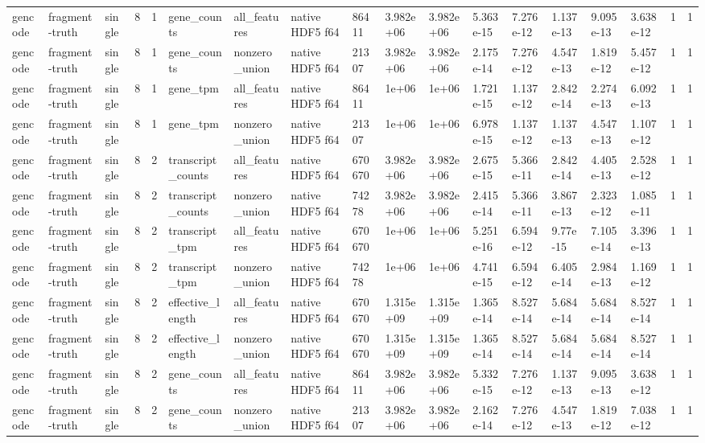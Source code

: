 \begin{tabular}{llllllllllllllllll}
gencode & fragment-truth & single & 8 & 1 & gene\_counts & all\_features & native HDF5 f64 & 86411 & 3.982e+06 & 3.982e+06 & 5.363e-15 & 7.276e-12 & 1.137e-13 & 9.095e-13 & 3.638e-12 & 1 & 1 \\
gencode & fragment-truth & single & 8 & 1 & gene\_counts & nonzero\_union & native HDF5 f64 & 21307 & 3.982e+06 & 3.982e+06 & 2.175e-14 & 7.276e-12 & 4.547e-13 & 1.819e-12 & 5.457e-12 & 1 & 1 \\
gencode & fragment-truth & single & 8 & 1 & gene\_tpm & all\_features & native HDF5 f64 & 86411 & 1e+06 & 1e+06 & 1.721e-15 & 1.137e-12 & 2.842e-14 & 2.274e-13 & 6.092e-13 & 1 & 1 \\
gencode & fragment-truth & single & 8 & 1 & gene\_tpm & nonzero\_union & native HDF5 f64 & 21307 & 1e+06 & 1e+06 & 6.978e-15 & 1.137e-12 & 1.137e-13 & 4.547e-13 & 1.107e-12 & 1 & 1 \\
gencode & fragment-truth & single & 8 & 2 & transcript\_counts & all\_features & native HDF5 f64 & 670670 & 3.982e+06 & 3.982e+06 & 2.675e-15 & 5.366e-11 & 2.842e-14 & 4.405e-13 & 2.528e-12 & 1 & 1 \\
gencode & fragment-truth & single & 8 & 2 & transcript\_counts & nonzero\_union & native HDF5 f64 & 74278 & 3.982e+06 & 3.982e+06 & 2.415e-14 & 5.366e-11 & 3.867e-13 & 2.323e-12 & 1.085e-11 & 1 & 1 \\
gencode & fragment-truth & single & 8 & 2 & transcript\_tpm & all\_features & native HDF5 f64 & 670670 & 1e+06 & 1e+06 & 5.251e-16 & 6.594e-12 & 9.77e-15 & 7.105e-14 & 3.396e-13 & 1 & 1 \\
gencode & fragment-truth & single & 8 & 2 & transcript\_tpm & nonzero\_union & native HDF5 f64 & 74278 & 1e+06 & 1e+06 & 4.741e-15 & 6.594e-12 & 6.405e-14 & 2.984e-13 & 1.169e-12 & 1 & 1 \\
gencode & fragment-truth & single & 8 & 2 & effective\_length & all\_features & native HDF5 f64 & 670670 & 1.315e+09 & 1.315e+09 & 1.365e-14 & 8.527e-14 & 5.684e-14 & 5.684e-14 & 8.527e-14 & 1 & 1 \\
gencode & fragment-truth & single & 8 & 2 & effective\_length & nonzero\_union & native HDF5 f64 & 670670 & 1.315e+09 & 1.315e+09 & 1.365e-14 & 8.527e-14 & 5.684e-14 & 5.684e-14 & 8.527e-14 & 1 & 1 \\
gencode & fragment-truth & single & 8 & 2 & gene\_counts & all\_features & native HDF5 f64 & 86411 & 3.982e+06 & 3.982e+06 & 5.332e-15 & 7.276e-12 & 1.137e-13 & 9.095e-13 & 3.638e-12 & 1 & 1 \\
gencode & fragment-truth & single & 8 & 2 & gene\_counts & nonzero\_union & native HDF5 f64 & 21307 & 3.982e+06 & 3.982e+06 & 2.162e-14 & 7.276e-12 & 4.547e-13 & 1.819e-12 & 7.038e-12 & 1 & 1 \\

\end{tabular}
